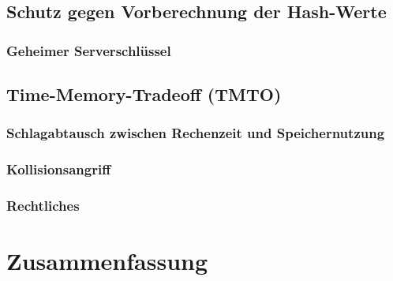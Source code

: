 \subsection{Schutz gegen Vorberechnung der Hash-Werte}
\subsubsection*{Geheimer Serverschlüssel}

\subsection{Time-Memory-Tradeoff (TMTO)}
\subsubsection*{Schlagabtausch zwischen Rechenzeit und Speichernutzung}
\subsubsection{Kollisionsangriff}
\subsubsection{Rechtliches}

\section{Zusammenfassung}











